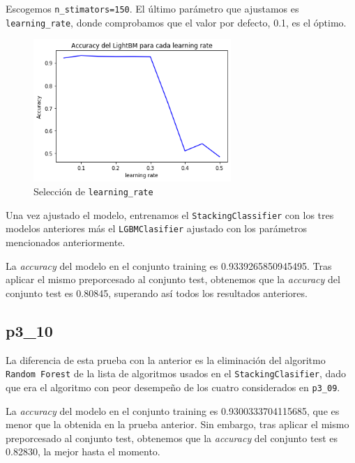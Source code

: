 \documentclass[a4]{article}
\begin{document}
\vspace{-8mm}
Escogemos \texttt{n\_stimators=150}. El último parámetro que ajustamos es \texttt{learning\_rate}, donde comprobamos que el valor por defecto, 0.1, es el óptimo.

\begin{figure}[H]
  \centering
  \caption{Selección de \texttt{learning\_rate}}
  \includegraphics[width=75mm]{imagenes/p3_09_learning_rate}
\end{figure}

Una vez ajustado el modelo, entrenamos el \texttt{StackingClassifier} con los tres modelos anteriores más el \texttt{LGBMClasifier} ajustado con los parámetros mencionados anteriormente.

La \textit{accuracy} del modelo en el conjunto training es 0.9339265850945495. Tras aplicar el mismo preporcesado al conjunto test, obtenemos que la \textit{accuracy} del conjunto test es 0.80845, superando así todos los resultados anteriores.

\subsection{p3\_10}

La diferencia de esta prueba con la anterior es la eliminación del algoritmo \texttt{Random Forest} de la lista de algoritmos usados en el \texttt{StackingClasifier}, dado que era el algoritmo con peor desempeño de los cuatro considerados en \texttt{p3\_09}.

La \textit{accuracy} del modelo en el conjunto training es 0.9300333704115685, que es menor que la obtenida en la prueba anterior. Sin embargo, tras aplicar el mismo preporcesado al conjunto test, obtenemos que la \textit{accuracy} del conjunto test es 0.82830, la mejor hasta el momento.
\end{document}
